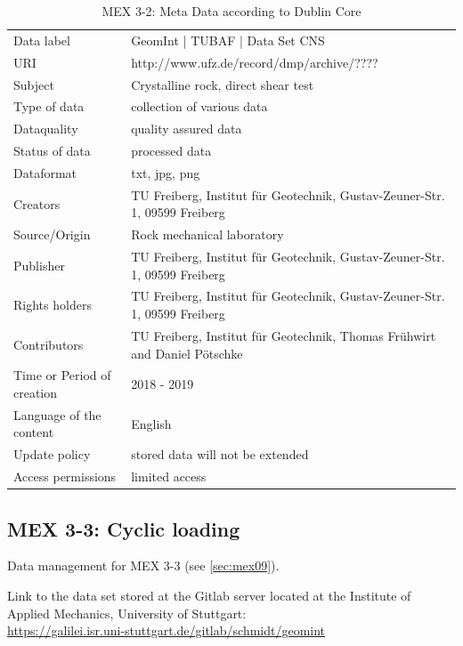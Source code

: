 \begin{table}[!ht]
\caption{MEX 3-2: Meta Data according to Dublin Core}
\label{tab:dms-mex3-2}
\small
\begin{tabular}{R{3cm}|L{7cm}}
\hline
%
Data label & GeomInt | TUBAF | Data Set CNS \\
URI & http://www.ufz.de/record/dmp/archive/???? \\
Subject  & Crystalline rock, direct shear test \\
Type of data  & collection of various data \\
Dataquality  & quality assured data \\
Status of data  & processed data \\
Dataformat  & txt, jpg, png \\
Creators  & TU Freiberg, Institut für Geotechnik, Gustav-Zeuner-Str. 1, 09599 Freiberg \\
Source/Origin  & Rock mechanical laboratory \\
Publisher  & TU Freiberg, Institut für Geotechnik, Gustav-Zeuner-Str. 1, 09599 Freiberg \\
Rights holders  & TU Freiberg, Institut für Geotechnik, Gustav-Zeuner-Str. 1, 09599 Freiberg \\
Contributors  & TU Freiberg, Institut für Geotechnik, Thomas Fr\"uhwirt and Daniel P\"otschke \\
Time or Period of creation  & 2018 - 2019 \\
Language of the content & English \\
Update policy  & stored data will not be extended \\
Access permissions  & limited access \\
%
\hline
\end{tabular}
\end{table}

\subsection{MEX 3-3: Cyclic loading}

Data management for MEX 3-3 (see \ref{sec:mex09}).

Link to the data set stored at the Gitlab server located at the Institute of Applied Mechanics, University of Stuttgart:\\
\hyperlink{https://galilei.isr.uni-stuttgart.de/gitlab/schmidt/geomint}{https://galilei.isr.uni-stuttgart.de/gitlab/schmidt/geomint}\\

